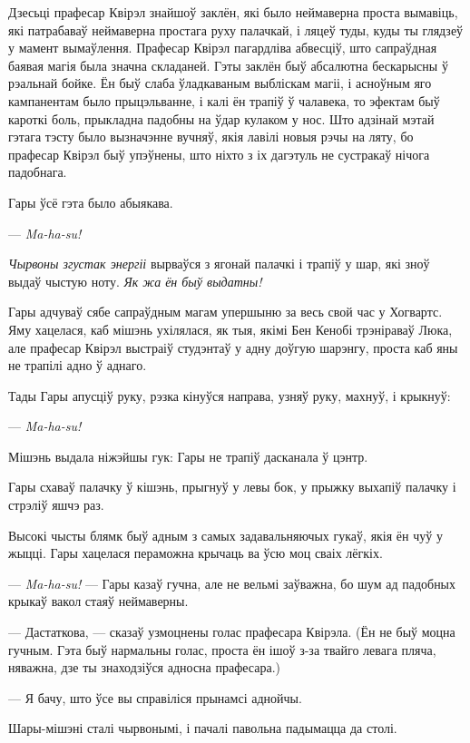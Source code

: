 Дзесьці прафесар Квірэл знайшоў заклён, які было неймаверна проста вымавіць,
які патрабаваў неймаверна простага руху палачкай, і ляцеў туды, куды ты глядзеў 
у мамент вымаўлення. Прафесар Квірэл пагардліва абвесціў, што сапраўдная баявая магія
была значна складаней. Гэты заклён быў абсалютна бескарысны ў рэальнай бойке. 
Ён быў слаба ўладкаваным выбліскам магіі, і асноўным яго кампанентам было
прыцэльванне, і калі ён трапіў ў чалавека, то эфектам быў кароткі боль,
прыкладна падобны на ўдар кулаком у нос. Што адзінай мэтай гэтага 
тэсту было вызначэнне вучняў, якія лавілі новыя рэчы на ляту, бо прафесар
Квірэл быў упэўнены, што ніхто з іх дагэтуль не сустракаў нічога падобнага.

Гары ўсё гэта было абыякава.

--- \emph{Ma-ha-su!}

\emph{Чырвоны згустак энергіі} вырваўся з ягонай палачкі і трапіў у шар, які зноў
выдаў чыстую ноту. \emph{Як жа ён быў выдатны!}

Гары адчуваў сябе сапраўдным магам упершыню за весь свой час у Хогвартс.
Яму хацелася, каб мішэнь ухілялася, як тыя, якімі Бен Кенобі трэніраваў 
Люка, але прафесар Квірэл выстраіў студэнтаў у адну доўгую шарэнгу, проста каб 
яны не трапілі адно ў аднаго. 

Тады Гары апусціў руку, рэзка кінуўся направа, узняў руку, махнуў, і крыкнуў:

--- \emph{Ma-ha-su!}

Мішэнь выдала ніжэйшы гук: Гары не трапіў дасканала ў цэнтр.

Гары схаваў палачку ў кішэнь, прыгнуў у левы бок, у прыжку выхапіў палачку і 
стрэліў яшчэ раз.

Высокі чысты блямк быў адным з самых задавальняючых гукаў, якія ён чуў у жыцці.
Гары хацелася пераможна крычаць ва ўсю моц сваіх лёгкіх. 
\emph{}

--- \emph{Ma-ha-su!} --- Гары казаў гучна, але не вельмі заўважна, бо шум ад 
падобных крыкаў вакол стаяў неймаверны.

--- Дастаткова, --- сказаў узмоцнены голас прафесара Квірэла. (Ён не быў моцна гучным.
Гэта быў нармальны голас, проста ён ішоў з-за твайго левага пляча, няважна, дзе 
ты знаходзіўся адносна прафесара.) 

--- Я бачу, што ўсе вы справіліся прынамсі аднойчы.

Шары-мішэні сталі чырвонымі, і пачалі павольна падымацца да столі.

